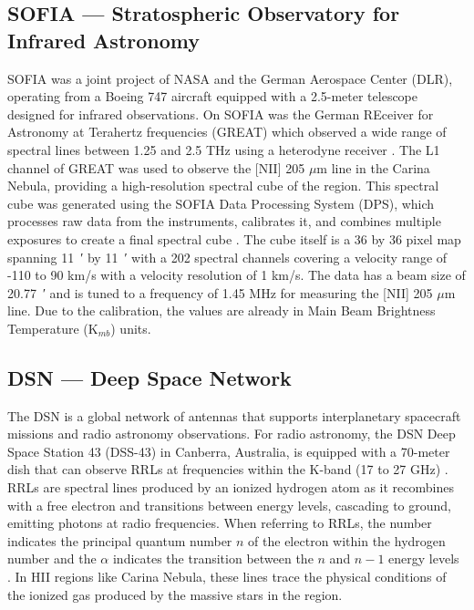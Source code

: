 \subsection{SOFIA --- Stratospheric Observatory for Infrared Astronomy}
SOFIA was a joint project of NASA and the German Aerospace Center (DLR), operating from a Boeing 747 aircraft equipped with a 2.5-meter telescope designed for infrared observations.
On SOFIA was the German REceiver for Astronomy at Terahertz frequencies (GREAT) which observed a wide range of spectral lines between 1.25 and 2.5 THz using a heterodyne receiver \parencite{heyminck2012great}.
The L1 channel of GREAT was used to observe the [NII] 205 $\mu$m line in the Carina Nebula, providing a high-resolution spectral cube of the region.
This spectral cube was generated using the SOFIA Data Processing System (DPS), which processes raw data from the instruments, calibrates it, and combines multiple exposures to create a final spectral cube \parencite{shuping2014overview}.
The cube itself is a 36 by 36 pixel map spanning \qty{11}{\arcminute} by \qty{11}{\arcminute} with a 202 spectral channels covering a velocity range of -110 to 90 km/s with a velocity resolution of 1 km/s.
The data has a beam size of \qty{20.77}{\arcminute}  and is tuned to a frequency of 1.45 MHz for measuring the [NII] 205 $\mu$m line.
Due to the calibration, the values are already in Main Beam Brightness Temperature (K$_{mb}$) units.

\subsection{DSN --- Deep Space Network}
The DSN is a global network of antennas that supports interplanetary spacecraft missions and radio astronomy observations.
For radio astronomy, the DSN Deep Space Station 43 (DSS-43) in Canberra, Australia, is equipped with a 70-meter dish that can observe RRLs at frequencies within the K-band (17 to 27 GHz) \parencite{virkler2020broadband}.
RRLs are spectral lines produced by an ionized hydrogen atom as it recombines with a free electron and transitions between energy levels, cascading to ground, emitting photons at radio frequencies.
When referring to RRLs, the number indicates the principal quantum number $n$ of the electron within the hydrogen number and the $\alpha$ indicates the transition between the $n$ and $n-1$ energy levels \parencite{tielens2005physics}.
In HII regions like Carina Nebula, these lines trace the physical conditions of the ionized gas produced by the massive stars in the region.

